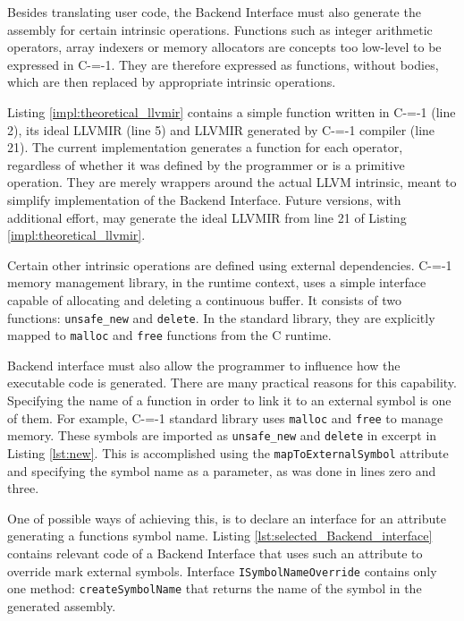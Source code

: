 Besides translating user code, the Backend Interface must also generate the assembly for certain intrinsic operations.
Functions such as integer arithmetic operators, array indexers or memory allocators are concepts too low-level to be expressed in C-=-1.
They are therefore expressed as functions, without bodies, which are then replaced by appropriate intrinsic operations.

Listing \ref{impl:theoretical_llvmir} contains a simple function written in C-=-1 (line 2), its ideal LLVMIR (line 5) and LLVMIR generated by C-=-1 compiler (line 21).
The current implementation generates a function for each operator, regardless of whether it was defined by the programmer or is a primitive operation.
They are merely wrappers around the actual LLVM intrinsic, meant to simplify implementation of the Backend Interface.
Future versions, with additional effort, may generate the ideal LLVMIR from line 21 of Listing \ref{impl:theoretical_llvmir}.

Certain other intrinsic operations are defined using external dependencies.
C-=-1 memory management library, in the runtime context, uses a simple interface capable of allocating and deleting a continuous buffer.
It consists of two functions: \lstinline{unsafe_new} and \lstinline{delete}.
In the standard library, they are explicitly mapped to \lstinline{malloc} and \lstinline{free} functions from the C runtime.

Backend interface must also allow the programmer to influence how the executable code is generated.
There are many practical reasons for this capability.
Specifying the name of a function in order to link it to an external symbol is one of them.
For example, C-=-1 standard library uses \lstinline{malloc} and \lstinline{free} to manage memory.
These symbols are imported as \lstinline{unsafe_new} and \lstinline{delete} in excerpt in Listing \ref{lst:new}.
This is accomplished using the \lstinline{mapToExternalSymbol} attribute and specifying the symbol name as a parameter, as was done in lines zero and three.

One of possible ways of achieving this, is to declare an interface for an attribute generating a functions symbol name.
Listing \ref{lst:selected_Backend_interface} contains relevant code of a Backend Interface that uses such an attribute to override mark external symbols.
Interface \lstinline{ISymbolNameOverride} contains only one method: \lstinline{createSymbolName} that returns the name of the symbol in the generated assembly.

